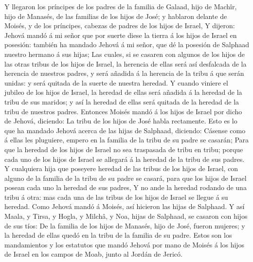  Y llegaron los príncipes de los padres de la familia de
Galaad, hijo de Machîr, hijo de Manasés, de las familias de los hijos de
José; y hablaron delante de Moisés, y de los príncipes, cabezas de
padres de los hijos de Israel,  Y dijeron: Jehová mandó á mi
señor que por suerte diese la tierra á los hijos de Israel en posesión:
también ha mandado Jehová á mi señor, que dé la posesión de Salphaad
nuestro hermano á sus hijas;  Las cuales, si se casaren con
algunos de los hijos de las otras tribus de los hijos de Israel, la
herencia de ellas será así desfalcada de la herencia de nuestros padres,
y será añadida á la herencia de la tribu á que serán unidas: y será
quitada de la suerte de nuestra heredad.  Y cuando viniere
el jubileo de los hijos de Israel, la heredad de ellas será añadida á la
heredad de la tribu de sus maridos; y así la heredad de ellas será
quitada de la heredad de la tribu de nuestros padres. 
Entonces Moisés mandó á los hijos de Israel por dicho de Jehová,
diciendo: La tribu de los hijos de José habla rectamente. 
Esto es lo que ha mandado Jehová acerca de las hijas de Salphaad,
diciendo: Cásense como á ellas les pluguiere, empero en la familia de la
tribu de su padre se casarán;  Para que la heredad de los
hijos de Israel no sea traspasada de tribu en tribu; porque cada uno de
los hijos de Israel se allegará á la heredad de la tribu de sus padres.
 Y cualquiera hija que poseyere heredad de las tribus de los
hijos de Israel, con alguno de la familia de la tribu de su padre se
casará, para que los hijos de Israel posean cada uno la heredad de sus
padres,  Y no ande la heredad rodando de una tribu á otra:
mas cada una de las tribus de los hijos de Israel se llegue á su
heredad.  Como Jehová mandó á Moisés, así hicieron las
hijas de Salphaad.  Y así Maala, y Tirsa, y Hogla, y
Milchâ, y Noa, hijas de Salphaad, se casaron con hijos de sus tíos:
 De la familia de los hijos de Manasés, hijo de José,
fueron mujeres; y la heredad de ellas quedó en la tribu de la familia de
su padre.  Estos son los mandamientos y los estatutos que
mandó Jehová por mano de Moisés á los hijos de Israel en los campos de
Moab, junto al Jordán de Jericó.
